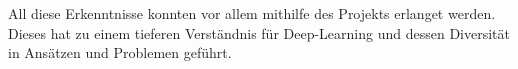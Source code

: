 All diese Erkenntnisse konnten vor allem mithilfe des Projekts erlanget werden. Dieses hat zu einem tieferen Verständnis für Deep-Learning und dessen Diversität in Ansätzen und Problemen geführt.





































